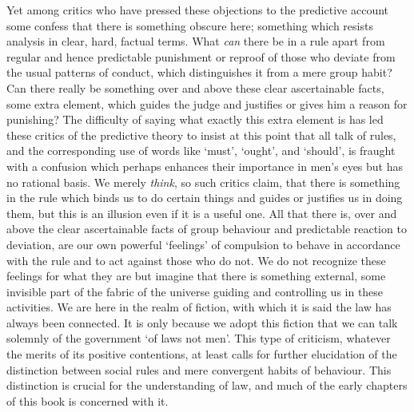 \documentclass[12pt,oneside]{book}  %
\begin{document}
Yet among critics who have pressed these objections to the predictive
account some confess that there is something obscure here; something
which resists analysis in clear, hard, factual terms. What \emph{can}
there be in a rule apart from regular and hence predictable punishment
or reproof of those who deviate from the usual patterns of conduct,
which distinguishes it from a mere group habit? Can there really be
something over and above these clear ascertainable facts, some extra
element, which guides the judge and justifies or gives him a reason for
punishing? The difficulty of saying what exactly this extra element is
has led these critics of the predictive theory to insist at this point
that all talk of rules, and the corresponding use of words like `must',
`ought', and `should', is fraught with a confusion which perhaps
enhances their importance in men's eyes but has no rational basis. We
merely \emph{think}, so such critics claim, that there is something in
the rule which binds us to do certain things and guides or justifies us
in doing them, but this is an illusion even if it is a useful one. All
that there is, over and above the clear ascertainable facts of group
behaviour and predictable reaction to deviation, are our own powerful
`feelings' of compulsion to behave in accordance with the rule and to
act against those who do not. We do not recognize these feelings for
what they are but imagine that there is something external, some
invisible part of the fabric of the universe guiding and controlling us
in these activities. We are here in the realm of fiction, with which it
is said the law has always been connected. It is only because we adopt
this fiction that we can talk solemnly of the government `of laws not
men'. This type of criticism, whatever the merits of its positive
contentions, at least calls for further elucidation of the distinction
between social rules and mere convergent habits of behaviour. This
distinction is crucial for the understanding of law, and much of the
early chapters of this book is concerned with it.
\end{document}
